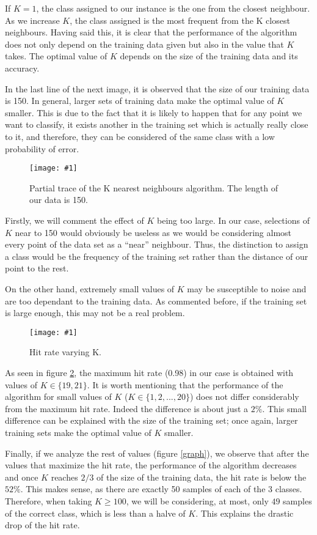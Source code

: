 \documentclass{article}
\newcommand{\myFigure}[4]{%
    \begin{figure}[H]
        \texttt{[image: \#1]}
        \centering
        \caption{#2}
        \label{#3}
    \end{figure}
}
\begin{document}
If $K=1$, the class assigned to our instance is the one from the closest neighbour. As we increase $K$, the class assigned is the most frequent from the K closest neighbours. Having said this, it is clear that the performance of the algorithm does not only depend on the training data given but also in the value that $K$ takes. The optimal value of $K$ depends on the size of the training data and its accuracy. 

In the last line of the next image, it is observed that the size of our training data is 150. In general, larger sets of training data make the optimal value of $K$ smaller. This is due to the fact that it is likely to happen that for any point we want to classify, it exists another in the training set which is actually really close to it, and therefore, they can be considered of the same class with a low probability of error.

\myFigure{./img/trace2.png}{Partial trace of the K nearest neighbours algorithm. The length of our data is 150.}{trace}{.9}

Firstly, we will comment the effect of $K$ being too large. In our case, selections of $K$ near to 150 would obviously be useless as we would be considering almost every point of the data set as a ``near'' neighbour. Thus, the distinction to assign a class would be the frequency of the training set rather than the distance of our point to the rest.

On the other hand, extremely small values of $K$ may be susceptible to noise and are too dependant to the training data. As commented before, if the training set is large enough, this may not be a real problem. 

\myFigure{./img/hitRate.png}{Hit rate varying K.}{hitRate}{.65}

As seen in figure \ref{hitRate}, the maximum hit rate (0.98) in our case is obtained with values of $K\in\{19,21\}$. It is worth mentioning that the performance of the algorithm for small values of $K$ ($K\in\{1,2,...,20\}$) does not differ considerably from the maximum hit rate. Indeed the difference is about just a $2\%$. This small difference can be explained with the size of the training set; once again, larger training sets make the optimal value of $K$ smaller. 

Finally, if we analyze the rest of values (figure \ref{graph}), we observe that after the values that maximize the hit rate, the performance of the algorithm decreases and once $K$ reaches $2/3$ of the size of the training data, the hit rate is below the $52\%$. This makes sense, as there are exactly 50 samples of each of the 3 classes. Therefore, when taking $K \geq 100$, we will be considering, at most, only $49$ samples of the correct class, which is less than a halve of $K$. This explains the drastic drop of the hit rate.
\end{document}
